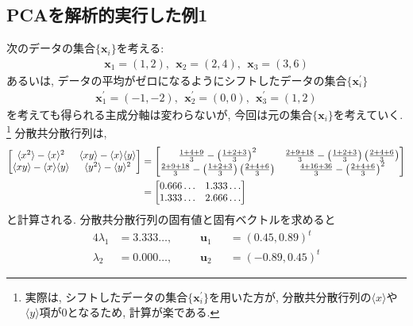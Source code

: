 \subsection{PCAを解析的実行した例1}
次のデータの集合$\{\mathbf{x}_{i}\}$を考える:
\begin{align}
  \mathbf{x}_{1} = (1,2),~~
  \mathbf{x}_{2} = (2,4),~~
  \mathbf{x}_{3} = (3,6)
\end{align}
あるいは, データの平均がゼロになるようにシフトしたデータの集合$\{\mathbf{x}_{i}^{\prime}\}$
\begin{align}
  \mathbf{x}_{1}^{\prime} = (-1,-2),~~
  \mathbf{x}_{2}^{\prime} = (0,0),~~
  \mathbf{x}_{3}^{\prime} = (1,2)
\end{align}
を考えても得られる主成分軸は変わらないが, 今回は元の集合$\{\mathbf{x}_{i}\}$を考えていく. 
\footnote{実際は, シフトしたデータの集合$\{\mathbf{x}_{i}^{\prime}\}$を用いた方が, 分散共分散行列の$\langle x \rangle$や$\langle y \rangle$項が0となるため, 計算が楽である. }
分散共分散行列は, 
\begin{align}
  \begin{bmatrix}
    \langle x^{2} \rangle - \langle x \rangle^{2} &
    \langle xy    \rangle - \langle x \rangle \langle y \rangle \\
    \langle xy    \rangle - \langle x \rangle \langle y \rangle &
    \langle y^{2} \rangle - \langle y \rangle^{2}
  \end{bmatrix}
  &=
  \begin{bmatrix}
    \frac{1+4+9}{3} - \left(\frac{1+2+3}{3}\right)^{2} &
    \frac{2+9+18}{3} - \left(\frac{1+2+3}{3}\right)\left(\frac{2+4+6}{3}\right) \\
    \frac{2+9+18}{3} - \left(\frac{1+2+3}{3}\right)\left(\frac{2+4+6}{3}\right) &
    \frac{4+16+36}{3} - \left(\frac{2+4+6}{3}\right)^{2}
  \end{bmatrix}
  \notag \\ &=
  \begin{bmatrix}
    0.666\ldots & 1.333\ldots \\
    1.333\ldots & 2.666\ldots
  \end{bmatrix}
  \notag
\end{align}
と計算される. 
分散共分散行列の固有値と固有ベクトルを求めると
\begin{alignat}{4}
  \lambda_{1} &= 3.333\ldots, ~~~~&& \mathbf{u}_{1} &&=  ( 0.45, 0.89)^{t} \\
  \lambda_{2} &= 0.000\ldots, ~~~~&& \mathbf{u}_{2} &&=  (-0.89, 0.45)^{t}
\end{alignat}
